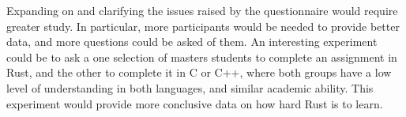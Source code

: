 Expanding on and clarifying the issues raised by the questionnaire would require greater study. In particular, more participants would be needed to provide better data, and more questions could be asked of them. An interesting experiment could be to ask a one selection of masters students to complete an assignment in Rust, and the other to complete it in C or C++, where both groups have a low level of understanding in both languages, and similar academic ability. This experiment would provide more conclusive data on how hard Rust is to learn.

